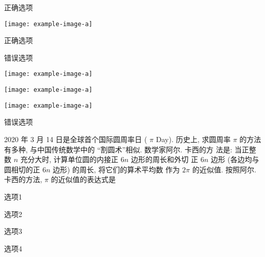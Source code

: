 \begin{xchoices}[]
  \item* 正确选项
  \item  \texttt{[image: example-image-a]}
  \item* 正确选项
  \item  错误选项
  \item  \texttt{[image: example-image-a]}
  \item  \texttt{[image: example-image-a]}
  \item  \texttt{[image: example-image-a]}
  \item  错误选项
\end{xchoices}
2020 年 3 月 14 日是全球首个国际圆周率日 ( $\pi$ Day). 历史上, 求圆周率 $\pi$ 的方法有多种, 与中国传统数学中的 “割圆术”相似. 数学家阿尔. 卡西的方 法是: 当正整数 $n$ 充分大时, 计算单位圆的内接正 $6 n$ 边形的周长和外切 正 $6 n$ 边形 (各边均与圆相切的正 $6 n$ 边形) 的周长, 将它们的算术平均数 作为 $2 \pi$ 的近似值. 按照阿尔. 卡西的方法, $\pi$ 的近似值的表达式是 \paren
\begin{xchoices}[items = 2, label-pos = left]
  \item 选项1
  \item 选项2
  \item 选项3
  \item 选项4
\end{xchoices}
